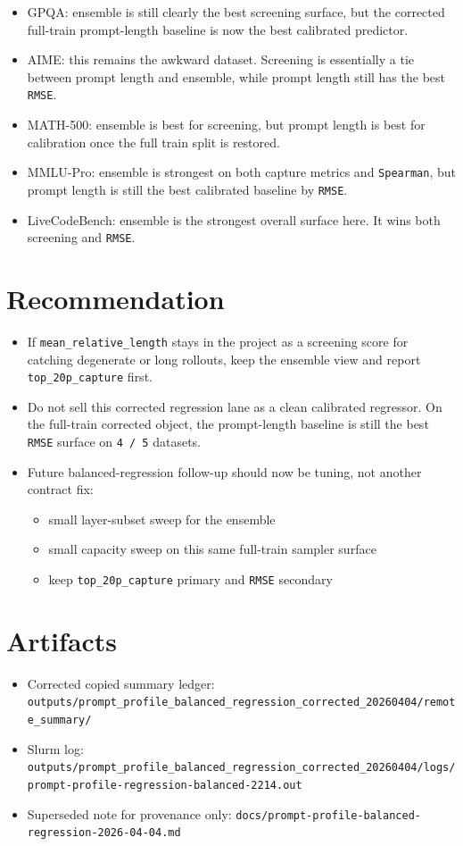 \documentclass[11pt]{article}
\begin{document}
\begin{itemize}
\item GPQA: ensemble is still clearly the best screening surface, but the corrected full-train prompt-length baseline is now the best calibrated predictor.
\item AIME: this remains the awkward dataset. Screening is essentially a tie between prompt length and ensemble, while prompt length still has the best \texttt{RMSE}.
\item MATH-500: ensemble is best for screening, but prompt length is best for calibration once the full train split is restored.
\item MMLU-Pro: ensemble is strongest on both capture metrics and \texttt{Spearman}, but prompt length is still the best calibrated baseline by \texttt{RMSE}.
\item LiveCodeBench: ensemble is the strongest overall surface here. It wins both screening and \texttt{RMSE}.
\end{itemize}

\section{Recommendation}

\begin{itemize}
\item If \texttt{mean\_relative\_length} stays in the project as a screening score for catching degenerate or long rollouts, keep the ensemble view and report \texttt{top\_20p\_capture} first.
\item Do not sell this corrected regression lane as a clean calibrated regressor. On the full-train corrected object, the prompt-length baseline is still the best \texttt{RMSE} surface on \texttt{4 / 5} datasets.
\item Future balanced-regression follow-up should now be tuning, not another contract fix:
  \begin{itemize}
  \item small layer-subset sweep for the ensemble
  \item small capacity sweep on this same full-train sampler surface
  \item keep \texttt{top\_20p\_capture} primary and \texttt{RMSE} secondary
  \end{itemize}
\end{itemize}

\section{Artifacts}

\begin{itemize}
\item Corrected copied summary ledger: \texttt{outputs/prompt\_profile\_balanced\_regression\_corrected\_20260404/remote\_summary/}
\item Slurm log: \texttt{outputs/prompt\_profile\_balanced\_regression\_corrected\_20260404/logs/prompt-profile-regression-balanced-2214.out}
\item Superseded note for provenance only: \texttt{docs/prompt-profile-balanced-regression-2026-04-04.md}
\end{itemize}
\end{document}
